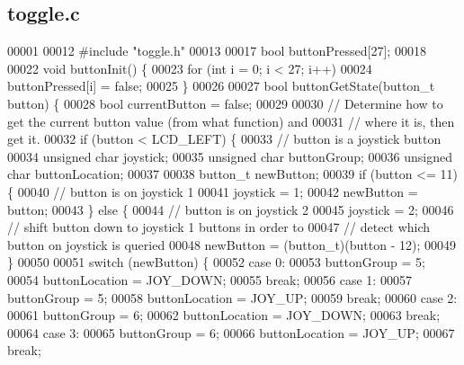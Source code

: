 \subsection{toggle.\+c}
\label{a00146_source}

\begin{DoxyCode}
00001 
00012 \textcolor{preprocessor}{#include "toggle.h"}
00013 
00017 \textcolor{keywordtype}{bool} buttonPressed[27];
00018 
00022 \textcolor{keywordtype}{void} buttonInit() \{
00023   \textcolor{keywordflow}{for} (\textcolor{keywordtype}{int} i = 0; i < 27; i++)
00024     buttonPressed[i] = \textcolor{keyword}{false};
00025 \}
00026 
00027 \textcolor{keywordtype}{bool} buttonGetState(button_t button) \{
00028   \textcolor{keywordtype}{bool} currentButton = \textcolor{keyword}{false};
00029 
00030   \textcolor{comment}{// Determine how to get the current button value (from what function) and}
00031   \textcolor{comment}{// where it is, then get it.}
00032   \textcolor{keywordflow}{if} (button < LCD_LEFT) \{
00033     \textcolor{comment}{// button is a joystick button}
00034     \textcolor{keywordtype}{unsigned} \textcolor{keywordtype}{char} joystick;
00035     \textcolor{keywordtype}{unsigned} \textcolor{keywordtype}{char} buttonGroup;
00036     \textcolor{keywordtype}{unsigned} \textcolor{keywordtype}{char} buttonLocation;
00037 
00038     button_t newButton;
00039     \textcolor{keywordflow}{if} (button <= 11) \{
00040       \textcolor{comment}{// button is on joystick 1}
00041       joystick = 1;
00042       newButton = button;
00043     \} \textcolor{keywordflow}{else} \{
00044       \textcolor{comment}{// button is on joystick 2}
00045       joystick = 2;
00046       \textcolor{comment}{// shift button down to joystick 1 buttons in order to}
00047       \textcolor{comment}{// detect which button on joystick is queried}
00048       newButton = (button_t)(button - 12);
00049     \}
00050 
00051     \textcolor{keywordflow}{switch} (newButton) \{
00052     \textcolor{keywordflow}{case} 0:
00053       buttonGroup = 5;
00054       buttonLocation = JOY\_DOWN;
00055       \textcolor{keywordflow}{break};
00056     \textcolor{keywordflow}{case} 1:
00057       buttonGroup = 5;
00058       buttonLocation = JOY\_UP;
00059       \textcolor{keywordflow}{break};
00060     \textcolor{keywordflow}{case} 2:
00061       buttonGroup = 6;
00062       buttonLocation = JOY\_DOWN;
00063       \textcolor{keywordflow}{break};
00064     \textcolor{keywordflow}{case} 3:
00065       buttonGroup = 6;
00066       buttonLocation = JOY\_UP;
00067       \textcolor{keywordflow}{break};

\end{DoxyCode}
